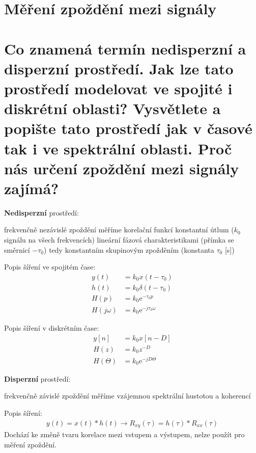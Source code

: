 \documentclass[a4paper,12pt]{article}   %
\newcommand{\mt}[1]{$#1$}
\newcommand{\e}{\text{e}}
\newcommand{\okruh}[1]{\section*{\Large #1}}
\begin{document}
\clearpage

\okruh{Měření zpoždění mezi signály} 
\section{Co znamená termín nedisperzní a disperzní prostředí. Jak lze tato prostředí modelovat ve spojité i diskrétní oblasti? Vysvětlete a popište tato prostředí jak v časové tak i ve spektrální oblasti. Proč nás určení zpoždění mezi signály zajímá?}\label{sec:zpozdeni:uvod}


\textbf{Nedisperzní} prostředí:
\begin{outline}
        \1 frekvenčně nezávislé
        \1 zpoždění měříme korelační funkcí
        \1 konstantní útlum (\mt{k_0} signálu na všech frekvencích)
        \1 lineární fázová charakteristikami (přímka se směrnicí \mt{-\tau_0})
        \2 tedy konstantním skupinovým zpožděním (konstanta \mt{\tau_0} [s])
\end{outline}

Popis šíření ve spojitém čase:\\
\begin{align*}
        y(t) &= k_0 x (t-\tau_0)\\
        h(t) &= k_0\delta(t-\tau_0)\\
        H(p) &= k_0\e^{-\tau_0 p}\\
        H(j\omega) &= k_0\e^{-j\tau_0\omega}
\end{align*}

Popis šíření v diskrétním čase:
\begin{align*}
        y[n] &= k_0 x[n-D]\\
        H(z) &= k_0z^{-D}\\
        H(\Theta) &= k_0\e^{-jD\Theta}
\end{align*} 


\textbf{Disperzní} prostředí:
\begin{outline}
        \1 frekvenčně závislé
        \1 zpoždění měříme vzájemnou spektrální hustotou a koherencí
\end{outline}

Popis šíření:
\begin{align*}
        y(t) = x(t)\ast h(t)\rightarrow R_{xy}(\tau) = h(\tau)\ast R_{xx}(\tau)
\end{align*}
Dochází ke změně tvaru korelace mezi vstupem a výstupem, nelze použít pro měření zpoždění. 
\end{document}
